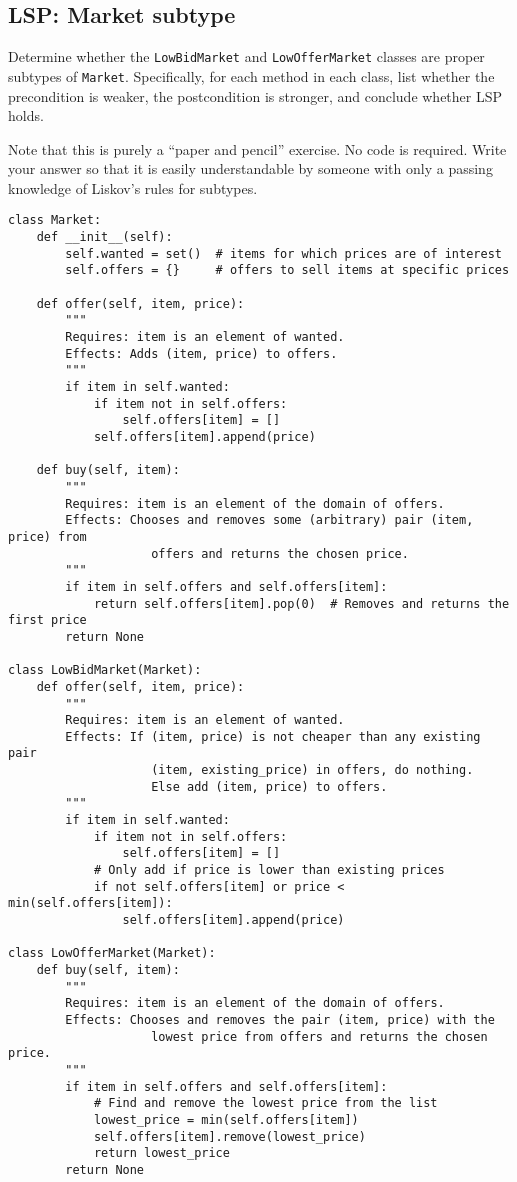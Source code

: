 \documentclass[oneside,11pt,dvipsnames]{book}
\newcommand{\code}[1]{\texttt{#1}}
\begin{document}
\subsection{LSP: Market subtype}

Determine whether the \code{LowBidMarket} and \code{LowOfferMarket} classes are proper subtypes of \code{Market}. Specifically, for each method in each class, list whether the precondition is weaker, the postcondition is stronger, and conclude whether LSP holds.

Note that this is purely a ``paper and pencil'' exercise. No code is required. Write your answer so that it is easily understandable by someone with only a passing knowledge of Liskov's rules for subtypes.


\begin{lstlisting}
class Market:
    def __init__(self):
        self.wanted = set()  # items for which prices are of interest
        self.offers = {}     # offers to sell items at specific prices

    def offer(self, item, price):
        """
        Requires: item is an element of wanted.
        Effects: Adds (item, price) to offers.
        """
        if item in self.wanted:
            if item not in self.offers:
                self.offers[item] = []
            self.offers[item].append(price)

    def buy(self, item):
        """
        Requires: item is an element of the domain of offers.
        Effects: Chooses and removes some (arbitrary) pair (item, price) from
                    offers and returns the chosen price.
        """
        if item in self.offers and self.offers[item]:
            return self.offers[item].pop(0)  # Removes and returns the first price
        return None

class LowBidMarket(Market):
    def offer(self, item, price):
        """
        Requires: item is an element of wanted.
        Effects: If (item, price) is not cheaper than any existing pair
                    (item, existing_price) in offers, do nothing.
                    Else add (item, price) to offers.
        """
        if item in self.wanted:
            if item not in self.offers:
                self.offers[item] = []
            # Only add if price is lower than existing prices
            if not self.offers[item] or price < min(self.offers[item]):
                self.offers[item].append(price)

class LowOfferMarket(Market):
    def buy(self, item):
        """
        Requires: item is an element of the domain of offers.
        Effects: Chooses and removes the pair (item, price) with the 
                    lowest price from offers and returns the chosen price.
        """
        if item in self.offers and self.offers[item]:
            # Find and remove the lowest price from the list
            lowest_price = min(self.offers[item])
            self.offers[item].remove(lowest_price)
            return lowest_price
        return None                
\end{lstlisting}
\end{document}
